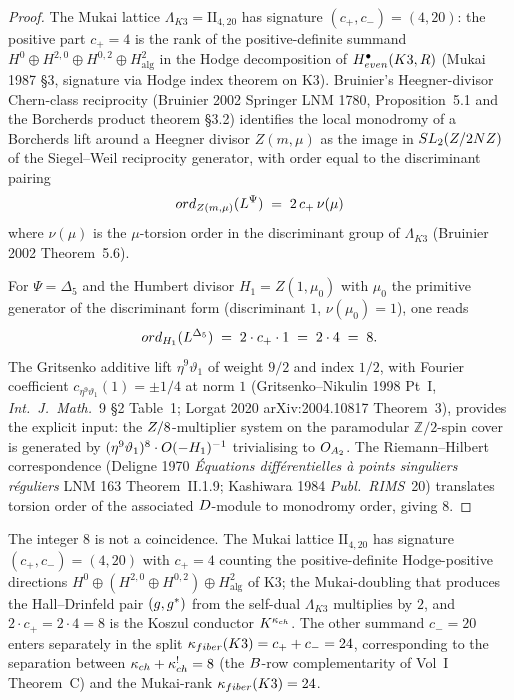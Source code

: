 \begin{proof}
The Mukai lattice $\Lambda_{K3} = \mathrm{II}_{4, 20}$ has signature
$(c_+, c_-) = (4, 20)$: the positive part $c_+ = 4$ is the rank of
the positive-definite summand $H^0 \oplus H^{2, 0} \oplus H^{0, 2}
\oplus H^2_{\mathrm{alg}}$ in the Hodge decomposition of
$H^\bullet_{even}(K3, R)$ (Mukai 1987 \S 3, signature
via Hodge index theorem on K3). Bruinier's Heegner-divisor
Chern-class reciprocity (Bruinier 2002 Springer LNM 1780,
Proposition~5.1 and the Borcherds product theorem \S 3.2) identifies
the local monodromy of a Borcherds lift around a Heegner divisor
$Z(m, \mu)$ as the image in $SL_2(Z / 2NZ)$ of the
Siegel--Weil reciprocity generator, with order equal to the
discriminant pairing
\[
 ord_{Z(m, \mu)}(L^\Psi) \;=\; 2\, c_+\, \nu(\mu)
\]
where $\nu(\mu)$ is the $\mu$-torsion order in the discriminant
group of $\Lambda_{K3}$ (Bruinier 2002 Theorem~5.6).

For $\Psi = \Delta_5$ and the Humbert divisor $H_1 = Z(1, \mu_0)$
with $\mu_0$ the primitive generator of the discriminant form
(discriminant $1$, $\nu(\mu_0) = 1$), one reads
\[
 ord_{H_1}(L^{\Delta_5}) \;=\; 2 \cdot c_+ \cdot 1
 \;=\; 2 \cdot 4 \;=\; 8.
\]
The Gritsenko additive lift $\eta^9 \vartheta_1$ of weight $9/2$ and
index $1/2$, with Fourier coefficient $c_{\eta^9 \vartheta_1}(1) =
\pm 1/4$ at norm $1$ (Gritsenko--Nikulin 1998 Pt~I,
\emph{Int.\ J.\ Math.}~9 \S 2 Table~1; Lorgat 2020
arXiv:2004.10817 Theorem~3), provides the explicit input:
the $Z/8$-multiplier system on the paramodular $\mathbb{Z}/2$-spin
cover is generated by $(\eta^9 \vartheta_1)^8 \cdot O(-H_1)^{-1}$
trivialising to $O_{A_2}$. The Riemann--Hilbert
correspondence (Deligne 1970 \emph{\'Equations diff\'erentielles
\`a points singuliers r\'eguliers} LNM 163 Theorem~II.1.9;
Kashiwara 1984 \emph{Publ.\ RIMS}~20) translates torsion order of
the associated $D$-module to monodromy order, giving $8$.
\end{proof}

\begin{remark}
\label{gluing:rem:eight-from-signature}
The integer $8$ is not a coincidence. The Mukai lattice
$\mathrm{II}_{4, 20}$ has signature $(c_+, c_-) = (4, 20)$ with
$c_+ = 4$ counting the positive-definite Hodge-positive directions
$H^0 \oplus (H^{2, 0} \oplus H^{0, 2}) \oplus H^2_{\mathrm{alg}}$
of K3; the Mukai-doubling that produces the Hall--Drinfeld pair
$(g, g^*)$ from the self-dual $\Lambda_{K3}$ multiplies by $2$,
and $2 \cdot c_+ = 2 \cdot 4 = 8$ is the Koszul conductor
$K^{\kappa_{ch}}$. The other summand $c_- = 20$ enters separately in the
split $\kappa_{fiber}(K3) = c_+ + c_- = 24$, corresponding to the
separation between $\kappa_{ch} + \kappa_{ch}^! = 8$ (the $B$-row
complementarity of Vol~I Theorem~C) and the Mukai-rank
$\kappa_{fiber}(K3) = 24$.
\end{remark}

